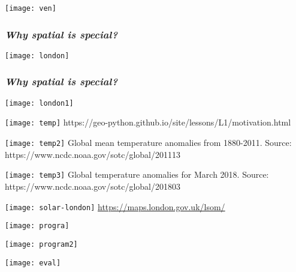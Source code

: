 \documentclass[12pt]{beamer}
\begin{document}
\begin{frame}
\centering
	\texttt{[image: ven]}
\end{frame}
 \begin{frame}
\frametitle{\emph{Why spatial is special?}}
\centering
	\texttt{[image: london]}
\end{frame}
  \begin{frame}
\frametitle{\emph{Why spatial is special?}}
\centering
	\texttt{[image: london1]}
\end{frame}
\begin{frame}
\centering
	\texttt{[image: temp]}\vfill
\tiny{https://geo-python.github.io/site/lessons/L1/motivation.html}
\end{frame}
\begin{frame}
\centering
	\texttt{[image: temp2]}\vfill
\tiny{Global mean temperature anomalies from 1880-2011. Source: https://www.ncdc.noaa.gov/sotc/global/201113}
\end{frame}
\begin{frame}
\centering
	\texttt{[image: temp3]}\vfill
\tiny{Global temperature anomalies for March 2018. Source: https://www.ncdc.noaa.gov/sotc/global/201803}
\end{frame}
\begin{frame}
\centering
	\texttt{[image: solar-london]}
\url{https://maps.london.gov.uk/lsom/}
\end{frame}
\begin{frame}
\centering
	\texttt{[image: progra]}
\end{frame}
\begin{frame}
\centering
	\texttt{[image: program2]}
\end{frame}
\begin{frame}
\centering
	\texttt{[image: eval]}
\end{frame}
\end{document}
